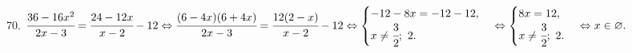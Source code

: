 70. $\cfrac{36-16x^2}{2x-3}=\cfrac{24-12x}{x-2}-12\Leftrightarrow
\cfrac{(6-4x)(6+4x)}{2x-3}=\cfrac{12(2-x)}{x-2}-12\Leftrightarrow
\begin{cases} -12-8x=-12-12,\\ x\neq\cfrac{3}{2};\ 2.\end{cases}\Leftrightarrow
\begin{cases} 8x=12,\\ x\neq\cfrac{3}{2};\ 2.\end{cases}\Leftrightarrow x\in\varnothing.$\\
